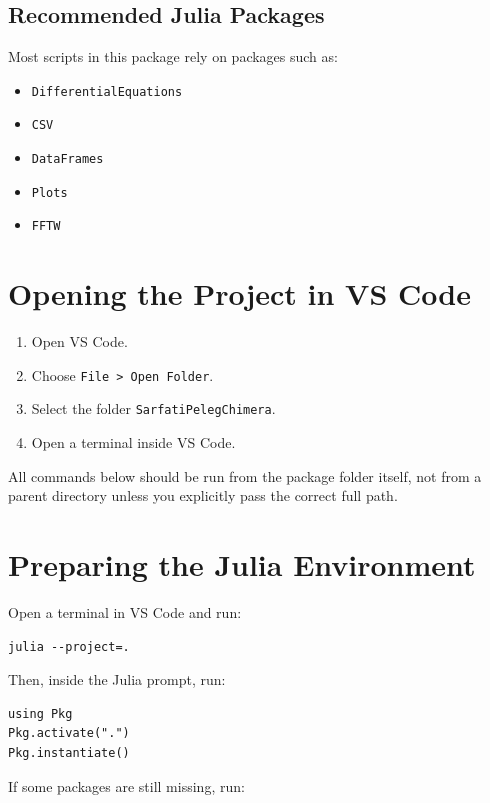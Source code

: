 \documentclass[11pt,a4paper]{article}
\begin{document}
\subsection{Recommended Julia Packages}
Most scripts in this package rely on packages such as:
\begin{itemize}[leftmargin=1.5em]
    \item \texttt{DifferentialEquations}
    \item \texttt{CSV}
    \item \texttt{DataFrames}
    \item \texttt{Plots}
    \item \texttt{FFTW}
\end{itemize}

\section{Opening the Project in VS Code}
\begin{enumerate}[leftmargin=1.5em]
    \item Open VS Code.
    \item Choose \texttt{File > Open Folder}.
    \item Select the folder \texttt{SarfatiPelegChimera}.
    \item Open a terminal inside VS Code.
\end{enumerate}

\begin{warnbox}
All commands below should be run from the package folder itself, not from a parent
directory unless you explicitly pass the correct full path.
\end{warnbox}

\section{Preparing the Julia Environment}
Open a terminal in VS Code and run:

\begin{lstlisting}[style=wincli]
julia --project=.
\end{lstlisting}

Then, inside the Julia prompt, run:

\begin{lstlisting}[style=wincli]
using Pkg
Pkg.activate(".")
Pkg.instantiate()
\end{lstlisting}

If some packages are still missing, run:
\end{document}
